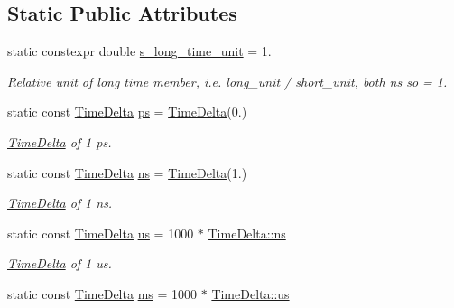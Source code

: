 \subsection*{Static Public Attributes}
\begin{DoxyCompactItemize}
\item 
\hypertarget{classTimeDelta_aaed4f6897565e9a943bc0fa22d11a7e6}{static constexpr double \hyperlink{classTimeDelta_aaed4f6897565e9a943bc0fa22d11a7e6}{s\-\_\-long\-\_\-time\-\_\-unit} = 1.}\label{classTimeDelta_aaed4f6897565e9a943bc0fa22d11a7e6}

\begin{DoxyCompactList}\small\item\em Relative unit of long time member, i.\-e. long\-\_\-unit / short\-\_\-unit, both ns so = 1. \end{DoxyCompactList}\item 
\hypertarget{classTimeDelta_a03f69da08874841bc4e2434f1a3c3bfa}{static const \hyperlink{classTimeDelta}{Time\-Delta} \hyperlink{classTimeDelta_a03f69da08874841bc4e2434f1a3c3bfa}{ps} = \hyperlink{classTimeDelta}{Time\-Delta}(0.)}\label{classTimeDelta_a03f69da08874841bc4e2434f1a3c3bfa}

\begin{DoxyCompactList}\small\item\em \hyperlink{classTimeDelta}{Time\-Delta} of 1 ps. \end{DoxyCompactList}\item 
\hypertarget{classTimeDelta_a18daad365109f816af53d205daa9daf9}{static const \hyperlink{classTimeDelta}{Time\-Delta} \hyperlink{classTimeDelta_a18daad365109f816af53d205daa9daf9}{ns} = \hyperlink{classTimeDelta}{Time\-Delta}(1.)}\label{classTimeDelta_a18daad365109f816af53d205daa9daf9}

\begin{DoxyCompactList}\small\item\em \hyperlink{classTimeDelta}{Time\-Delta} of 1 ns. \end{DoxyCompactList}\item 
\hypertarget{classTimeDelta_a507b83ceb342b95a0c5343f488f12b34}{static const \hyperlink{classTimeDelta}{Time\-Delta} \hyperlink{classTimeDelta_a507b83ceb342b95a0c5343f488f12b34}{us} = 1000 $\ast$ \hyperlink{classTimeDelta_a18daad365109f816af53d205daa9daf9}{Time\-Delta\-::ns}}\label{classTimeDelta_a507b83ceb342b95a0c5343f488f12b34}

\begin{DoxyCompactList}\small\item\em \hyperlink{classTimeDelta}{Time\-Delta} of 1 us. \end{DoxyCompactList}\item 
\hypertarget{classTimeDelta_a46782a352ae9ed3cffd8f8a4d50828ed}{static const \hyperlink{classTimeDelta}{Time\-Delta} \hyperlink{classTimeDelta_a46782a352ae9ed3cffd8f8a4d50828ed}{ms} = 1000 $\ast$ \hyperlink{classTimeDelta_a507b83ceb342b95a0c5343f488f12b34}{Time\-Delta\-::us}}\label{classTimeDelta_a46782a352ae9ed3cffd8f8a4d50828ed}


\end{DoxyCompactItemize}
